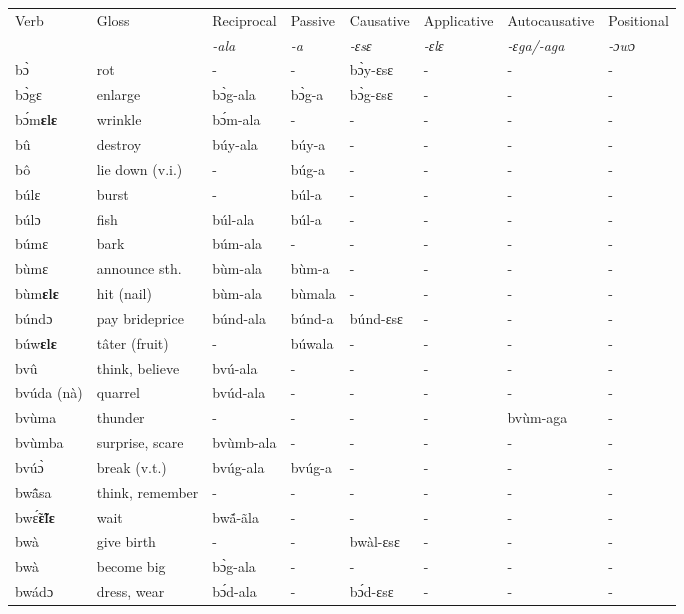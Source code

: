 \begin{sidewaystable}
\begin{tabular}{llllllll}
 \lsptoprule
 Verb & Gloss & Reciprocal & Passive  & Causative  & Applicative   & Autocausative & Positional   \\
  &    & {\itshape -ala} & {\itshape -a} & {\itshape -ɛsɛ} & {\itshape -ɛlɛ} & {\itshape -ɛga/-aga}  & {\itshape -ɔwɔ}  \\
\midrule
bɔ̀ & rot & - & - &  bɔ̀y-ɛsɛ & - & - & - \\
bɔ̀gɛ & enlarge & bɔ̀g-ala & bɔ̀g-a & bɔ̀g-ɛsɛ & - & - & - \\
bɔ́m{\bfseries ɛlɛ} & wrinkle &  bɔ́m-ala & - & - & - & - & - \\
bû & destroy & búy-ala & búy-a & - & - & - & - \\
bô & lie down (v.i.) & - & búg-a & - & - & - &  -  \\
búlɛ & burst & - & búl-a & - & - & - & - \\
búlɔ & fish & búl-ala & búl-a & - & -  & - & - \\
búmɛ & bark & búm-ala & - & - & - & - & - \\
bùmɛ & announce sth. & bùm-ala & bùm-a & - & -  & - & - \\
bùm{\bfseries ɛlɛ} & hit (nail) & bùm-ala & bùmala & - & - & - & - \\
búndɔ & pay brideprice & búnd-ala & búnd-a & búnd-ɛsɛ & - & - & - \\
búw{\bfseries ɛlɛ} & tâter (fruit) & - & búwala  & - & - & - & - \\
bvû & think, believe & bvú-ala  & - & - & - & - & - \\
bvúda (nà) & quarrel & bvúd-ala & - & - & - & - & - \\
bvùma & thunder & - & - & -  & - & bvùm-aga & - \\
bvùmba & surprise, scare  & bvùmb-ala & - & - & - & - & -  \\
bvúɔ̀ & break (v.t.) & bvúg-ala & bvúg-a & - & - & - & -  \\
bwã̂sa & think, remember  & - & - & - & - & - & - \\
bwɛ̃́{\bfseries ɛ̃lɛ} & wait & bwã́-ãla & - & - & - & - & - \\
bwà & give birth & - & - & bwàl-ɛsɛ & - & - & - \\
bwà & become big & bɔ̀g-ala & - & - & - & - & - \\
bwádɔ & dress, wear & bɔ́d-ala  & - & bɔ́d-ɛsɛ  & - & - & - \\
\midrule\end{tabular}\end{sidewaystable}

